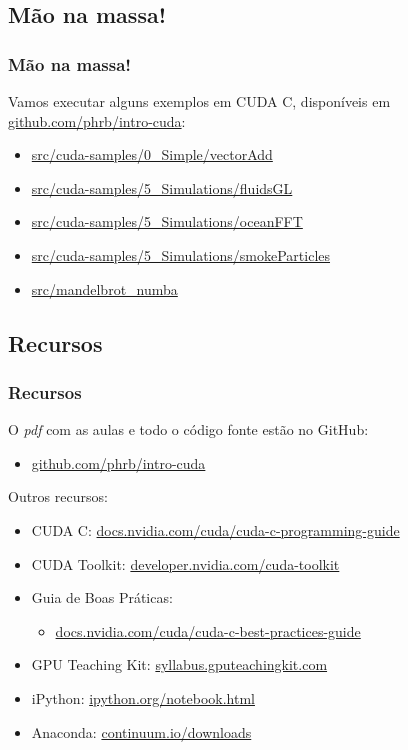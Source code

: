 \documentclass[10pt, compress, aspectratio=43, xcolor={table,usenames,dvipsnames}]{beamer}
\begin{document}
\subsection{Mão na massa!}

\begin{frame}
    \frametitle{Mão na massa!}
    Vamos executar alguns exemplos em CUDA C,
    disponíveis em \url{github.com/phrb/intro-cuda}:
    \begin{itemize}
        \item \url{src/cuda-samples/0_Simple/vectorAdd}
        \item \url{src/cuda-samples/5_Simulations/fluidsGL}
        \item \url{src/cuda-samples/5_Simulations/oceanFFT}
        \item \url{src/cuda-samples/5_Simulations/smokeParticles}
        \item \url{src/mandelbrot_numba}
    \end{itemize}
\end{frame}

\subsection{Recursos}

\begin{frame}
    \frametitle{Recursos}
    O \emph{pdf} com as aulas e todo o código fonte estão no \alert{GitHub}:

    \begin{itemize}
        \item \url{github.com/phrb/intro-cuda}
    \end{itemize}

    Outros recursos:

    \begin{itemize}
        \item CUDA C: \url{docs.nvidia.com/cuda/cuda-c-programming-guide}
        \item CUDA Toolkit: \url{developer.nvidia.com/cuda-toolkit}
        \item Guia de Boas Práticas:
            \begin{itemize}
                \item \url{docs.nvidia.com/cuda/cuda-c-best-practices-guide}
            \end{itemize}
        \item GPU Teaching Kit: \url{syllabus.gputeachingkit.com}
        \item iPython: \url{ipython.org/notebook.html}
        \item Anaconda: \url{continuum.io/downloads}
    \end{itemize}
\end{frame}
\end{document}

